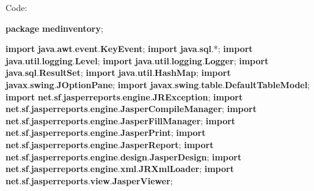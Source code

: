 \documentclass[
  10pt,
]{article}
\author{}
\date{}
\newenvironment{Shaded}{}{}
\newcommand{\ImportTok}[1]{\textcolor[rgb]{0.00,0.50,0.00}{\textbf{#1}}}
\newcommand{\KeywordTok}[1]{\textcolor[rgb]{0.00,0.44,0.13}{\textbf{#1}}}
\newcommand{\OperatorTok}[1]{\textcolor[rgb]{0.40,0.40,0.40}{#1}}
\begin{document}
\Large Code: \normalsize

\begin{Shaded}
\begin{Highlighting}[numbers=left,,]
\KeywordTok{package}\ImportTok{ medinventory}\OperatorTok{;}

\KeywordTok{import} \ImportTok{java}\OperatorTok{.}\ImportTok{awt}\OperatorTok{.}\ImportTok{event}\OperatorTok{.}\ImportTok{KeyEvent}\OperatorTok{;}
\KeywordTok{import} \ImportTok{java}\OperatorTok{.}\ImportTok{sql}\OperatorTok{.*;}
\KeywordTok{import} \ImportTok{java}\OperatorTok{.}\ImportTok{util}\OperatorTok{.}\ImportTok{logging}\OperatorTok{.}\ImportTok{Level}\OperatorTok{;}
\KeywordTok{import} \ImportTok{java}\OperatorTok{.}\ImportTok{util}\OperatorTok{.}\ImportTok{logging}\OperatorTok{.}\ImportTok{Logger}\OperatorTok{;}
\KeywordTok{import} \ImportTok{java}\OperatorTok{.}\ImportTok{sql}\OperatorTok{.}\ImportTok{ResultSet}\OperatorTok{;}
\KeywordTok{import} \ImportTok{java}\OperatorTok{.}\ImportTok{util}\OperatorTok{.}\ImportTok{HashMap}\OperatorTok{;}
\KeywordTok{import} \ImportTok{javax}\OperatorTok{.}\ImportTok{swing}\OperatorTok{.}\ImportTok{JOptionPane}\OperatorTok{;}
\KeywordTok{import} \ImportTok{javax}\OperatorTok{.}\ImportTok{swing}\OperatorTok{.}\ImportTok{table}\OperatorTok{.}\ImportTok{DefaultTableModel}\OperatorTok{;}
\KeywordTok{import} \ImportTok{net}\OperatorTok{.}\ImportTok{sf}\OperatorTok{.}\ImportTok{jasperreports}\OperatorTok{.}\ImportTok{engine}\OperatorTok{.}\ImportTok{JRException}\OperatorTok{;}
\KeywordTok{import} \ImportTok{net}\OperatorTok{.}\ImportTok{sf}\OperatorTok{.}\ImportTok{jasperreports}\OperatorTok{.}\ImportTok{engine}\OperatorTok{.}\ImportTok{JasperCompileManager}\OperatorTok{;}
\KeywordTok{import} \ImportTok{net}\OperatorTok{.}\ImportTok{sf}\OperatorTok{.}\ImportTok{jasperreports}\OperatorTok{.}\ImportTok{engine}\OperatorTok{.}\ImportTok{JasperFillManager}\OperatorTok{;}
\KeywordTok{import} \ImportTok{net}\OperatorTok{.}\ImportTok{sf}\OperatorTok{.}\ImportTok{jasperreports}\OperatorTok{.}\ImportTok{engine}\OperatorTok{.}\ImportTok{JasperPrint}\OperatorTok{;}
\KeywordTok{import} \ImportTok{net}\OperatorTok{.}\ImportTok{sf}\OperatorTok{.}\ImportTok{jasperreports}\OperatorTok{.}\ImportTok{engine}\OperatorTok{.}\ImportTok{JasperReport}\OperatorTok{;}
\KeywordTok{import} \ImportTok{net}\OperatorTok{.}\ImportTok{sf}\OperatorTok{.}\ImportTok{jasperreports}\OperatorTok{.}\ImportTok{engine}\OperatorTok{.}\ImportTok{design}\OperatorTok{.}\ImportTok{JasperDesign}\OperatorTok{;}
\KeywordTok{import} \ImportTok{net}\OperatorTok{.}\ImportTok{sf}\OperatorTok{.}\ImportTok{jasperreports}\OperatorTok{.}\ImportTok{engine}\OperatorTok{.}\ImportTok{xml}\OperatorTok{.}\ImportTok{JRXmlLoader}\OperatorTok{;}
\KeywordTok{import} \ImportTok{net}\OperatorTok{.}\ImportTok{sf}\OperatorTok{.}\ImportTok{jasperreports}\OperatorTok{.}\ImportTok{view}\OperatorTok{.}\ImportTok{JasperViewer}\OperatorTok{;}


\end{Highlighting}
\end{Shaded}
\end{document}
